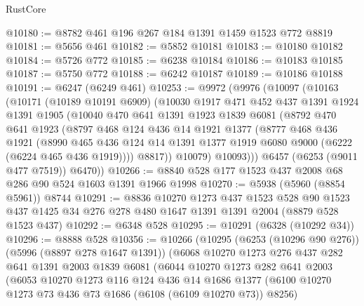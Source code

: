 \begin{lexlean}{RustCore}
\begin{coremodule}
@10180 := @8782 @461 @196 @267 @184 @1391 @1459 @1523 @772 @8819
@10181 := @5656 @461
@10182 := @5852 @10181
@10183 := @10180 @10182
@10184 := @5726 @772
@10185 := @6238 @10184
@10186 := @10183 @10185
@10187 := @5750 @772
@10188 := @6242 @10187
@10189 := @10186 @10188
@10191 := @6247 (@6249 @461)
@10253 := @9972
    (@9976
      (@10097
        (@10163
          (@10171
            (@10189 @10191 @6909)
            (@10030
              @1917
              @471
              @452
              @437
              @1391
              @1924
              @1391
              @1905
              (@10040
                @470
                @641
                @1391
                @1923
                @1839
                @6081
                (@8792
                  @470
                  @641
                  @1923
                  (@8797
                    @468
                    @124
                    @436
                    @14
                    @1921
                    @1377
                    (@8777
                      @468
                      @436
                      @1921
                      (@8990
                        @465
                        @436
                        @124
                        @14
                        @1391
                        @1377
                        @1919
                        @6080
                        @9000
                        (@6222 (@6224 @465 @436 @1919))))
                    @8817))
                @10079)
              @10093)))
        @6457
        (@6253 (@9011 @477 @7519))
        @6470))
@10266 := @8840 @528 @177 @1523 @437 @2008 @68 @286 @90 @524 @1603 @1391 @1966 @1998
@10270 := @5938 (@5960 (@8854 @5961)) @8744
@10291 := @8836
    @10270
    @1273
    @437
    @1523
    @528
    @90
    @1523
    @437
    @1425
    @34
    @276
    @278
    @480
    @1647
    @1391
    @1391
    @2004
    (@8879 @528 @1523 @437)
@10292 := @6348 @528
@10295 := @10291 (@6328 (@10292 @34))
@10296 := @8888 @528
@10356 := @10266
    (@10295
      (@6253 (@10296 @90 @276))
      (@5996 (@8897 @278 @1647 @1391))
      (@6068
        @10270
        @1273
        @276
        @437
        @282
        @641
        @1391
        @2003
        @1839
        @6081
        (@6044
          @10270
          @1273
          @282
          @641
          @2003
          (@6053
            @10270
            @1273
            @116
            @124
            @436
            @14
            @1686
            @1377
            (@6100 @10270 @1273 @73 @436 @73 @1686 (@6108 (@6109 @10270 @73)) @8256)

\end{coremodule}
\end{lexlean}
